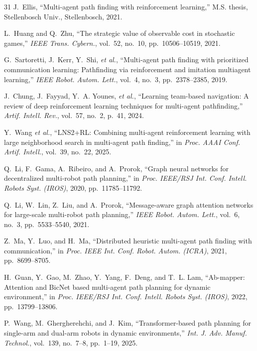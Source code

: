 \documentclass[conference]{IEEEtran}
\newcommand{\etal}{\textit{et al.}}
\begin{document}
\begin{thebibliography}{31}
J.~Ellis,
``Multi-agent path finding with reinforcement learning,''
M.S. thesis, Stellenbosch Univ., Stellenbosch, 2021.

L.~Huang and Q.~Zhu,
``The strategic value of observable cost in stochastic games,''
\emph{IEEE Trans. Cybern.}, vol.~52, no.~10,
pp.~10506--10519, 2021.

G.~Sartoretti, J.~Kerr, Y.~Shi, \etal,
``Multi-agent path finding with prioritized communication
learning: Pathfinding via reinforcement and imitation multiagent
learning,''
\emph{IEEE Robot. Autom. Lett.}, vol.~4, no.~3,
pp.~2378--2385, 2019.

J.~Chung, J.~Fayyad, Y.~A. Younes, \etal,
``Learning team-based navigation: A review of deep reinforcement
learning techniques for multi-agent pathfinding,''
\emph{Artif. Intell. Rev.}, vol.~57, no.~2, p.~41, 2024.

Y.~Wang \etal,
``LNS2+RL: Combining multi-agent reinforcement learning with
large neighborhood search in multi-agent path finding,''
in \emph{Proc. AAAI Conf. Artif. Intell.}, vol.~39, no.~22,
2025.

Q.~Li, F.~Gama, A.~Ribeiro, and A.~Prorok,
``Graph neural networks for decentralized multi-robot path
planning,''
in \emph{Proc. IEEE/RSJ Int. Conf. Intell. Robots Syst. (IROS)},
2020, pp.~11785--11792.

Q.~Li, W.~Lin, Z.~Liu, and A.~Prorok,
``Message-aware graph attention networks for large-scale
multi-robot path planning,''
\emph{IEEE Robot. Autom. Lett.}, vol.~6, no.~3,
pp.~5533--5540, 2021.

Z.~Ma, Y.~Luo, and H.~Ma,
``Distributed heuristic multi-agent path finding with
communication,''
in \emph{Proc. IEEE Int. Conf. Robot. Autom. (ICRA)},
2021, pp.~8699--8705.

H.~Guan, Y.~Gao, M.~Zhao, Y.~Yang, F.~Deng, and T.~L. Lam,
``Ab-mapper: Attention and BicNet based multi-agent path planning
for dynamic environment,''
in \emph{Proc. IEEE/RSJ Int. Conf. Intell. Robots Syst. (IROS)},
2022, pp.~13799--13806.

P.~Wang, M.~Ghergherehchi, and J.~Kim,
``Transformer-based path planning for single-arm and dual-arm
robots in dynamic environments,''
\emph{Int. J. Adv. Manuf. Technol.}, vol.~139, no.~7--8,
pp.~1--19, 2025.


\end{thebibliography}
\end{document}
